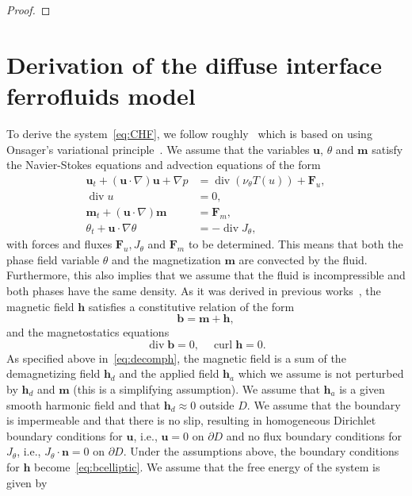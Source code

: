 \documentclass[10pt,letterpaper,twoside]{amsart}
\theoremstyle{definition}{\newtheorem{definition}[lemma]{Definition}}
\theoremstyle{note}{\newtheorem{claim}{Claim}[section]
\newtheorem*{claim*}{Claim}}
\numberwithin{equation}{section}
\newcommand{\dom}{D}
\newcommand{\Grad}{\nabla}
\newcommand{\Div}{\operatorname{div}}
\newcommand{\Curl}{\operatorname{curl}}
\newcommand{\bu}{\mathbf{u}}
\newcommand{\bm}{\mathbf{m}}
\newcommand{\Fu}{\mathbf{F}_u}
\newcommand{\Fm}{\mathbf{F}_m}
\newcommand{\Jtheta}{J_\theta}
\newcommand{\bh}{\mathbf{h}}
\begin{document}
\begin{proof}
	
	
	
\end{proof}


\appendix

 
\section{Derivation of the diffuse interface ferrofluids model}
\label{sec:derivation}
To derive the system~\eqref{eq:CHF}, we follow roughly~\cite{Nochetto2014} which is based on using Onsager's variational principle~\cite{Onsager1931,Onsager1931b}. We assume that the variables $\bu$, $\theta$ and $\bm$ satisfy the Navier-Stokes equations and advection equations of the form
\begin{align}
	\bu_t +(\bu\cdot\Grad)\bu +\Grad p &= \Div(\nu_\theta T(u))+\Fu,\label{eq:uansatz}\\
	\Div u & = 0,\\
	\bm_t +(\bu\cdot\Grad)\bm& = \Fm,\label{eq:mansatz}\\
	\theta_t+ \bu\cdot \Grad \theta & = -\Div \Jtheta,\label{eq:thetaansatz}
\end{align}
with forces and fluxes $\Fu, \Jtheta$ and $\Fm$ to be determined. This means that both the phase field variable $\theta$ and the magnetization $\bm$ are convected by the fluid. Furthermore, this also implies that we assume that the fluid is incompressible and both phases have the same density. As it was derived in previous works~\cite{Rosensweig1985,Rosensweig1985a,Odenbach2002}, the magnetic field $\bh$ satisfies a constitutive relation of the form
\begin{equation}\label{eq:bfield}
	\mathbf{b}= \bm + \bh,
\end{equation}
and the magnetostatics equations
\begin{equation}\label{eq:hfield}
	\Div \mathbf{b}=0,\quad \Curl\bh = 0.
\end{equation}
As specified above in~\eqref{eq:decomph}, the magnetic field is a sum of the demagnetizing field $\bh_d$ and the applied field $\bh_a$ which we assume is not perturbed by $\bh_d$ and $\bm$ (this is a simplifying assumption). We assume that $\bh_a$ is a given smooth harmonic field and that $\bh_d\approx 0$ outside $\dom$. We assume that the boundary is impermeable and that there is no slip, resulting in homogeneous Dirichlet boundary conditions for $\bu$, i.e., $\bu=0$ on $\partial\dom$ and no flux boundary conditions for $\Jtheta$, i.e., $\Jtheta\cdot \mathbf{n} = 0$ on $\partial\dom$. Under the assumptions above, the boundary conditions for $\bh$ become~\eqref{eq:bcelliptic}. We assume that the free energy of the system is given by
\end{document}
